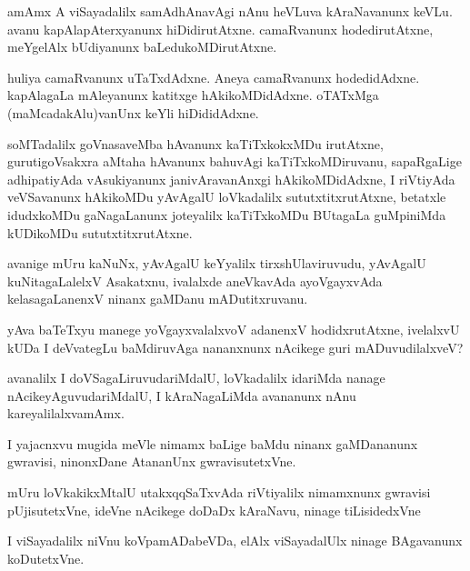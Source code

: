 \documentclass{article}
\begin{document}
\begin{mn}%
amAmx A viSayadalilx samAdhAnavAgi nAnu heVLuva kAraNavanunx
keVLu. avanu kapAlapAterxyanunx hiDidirutAtxne. camaRvanunx
hodedirutAtxne, meYgelAlx bUdiyanunx baLedukoMDirutAtxne.
\end{mn}

\begin{mn}%
huliya camaRvanunx uTaTxdAdxne. Aneya camaRvanunx
hodedidAdxne. kapAlagaLa mAleyanunx katitxge hAkikoMDidAdxne. oTATxMga
(maMcadakAlu)vanUnx keYli hiDididAdxne.
\end{mn}

\begin{mn}%
soMTadalilx goVnasaveMba hAvanunx kaTiTxkokxMDu irutAtxne,
gurutigoVsakxra aMtaha hAvanunx bahuvAgi kaTiTxkoMDiruvanu,
sapaRgaLige adhipatiyAda vAsukiyanunx janivAravanAnxgi
hAkikoMDidAdxne, I riVtiyAda veVSavanunx hAkikoMDu yAvAgalU
loVkadalilx sututxtitxrutAtxne, betatxle idudxkoMDu gaNagaLanunx
joteyalilx kaTiTxkoMDu BUtagaLa guMpiniMda kUDikoMDu sututxtitxrutAtxne.
\end{mn}

\begin{mn}
avanige mUru kaNuNx, yAvAgalU keYyalilx tirxshUlaviruvudu, yAvAgalU
kuNitagaLalelxV Asakatxnu, ivalalxde aneVkavAda ayoVgayxvAda
kelasagaLanenxV ninanx gaMDanu mADutitxruvanu.
\end{mn}

\begin{mn}
yAva baTeTxyu manege yoVgayxvalalxvoV adanenxV hodidxrutAtxne,
ivelalxvU kUDa I deVvategLu baMdiruvAga nananxnunx nAcikege guri mADuvudilalxveV?
\end{mn}

\begin{mn}%
avanalilx I doVSagaLiruvudariMdalU, loVkadalilx idariMda nanage
nAcikeyAguvudariMdalU, I kAraNagaLiMda avananunx nAnu kareyalilalxvamAmx.
\end{mn}

\begin{mn}%
I yajacnxvu mugida meVle nimamx baLige baMdu ninanx gaMDananunx
gwravisi, ninonxDane AtananUnx gwravisutetxVne.
\end{mn}

\begin{mn}
mUru loVkakikxMtalU utakxqqSaTxvAda riVtiyalilx nimamxnunx gwravisi
pUjisutetxVne, ideVne nAcikege doDaDx kAraNavu, ninage tiLisidedxVne
\end{mn}

\begin{mn} 
I viSayadalilx niVnu koVpamADabeVDa, elAlx viSayadalUlx ninage
BAgavanunx koDutetxVne.
\end{mn}
\end{document}
